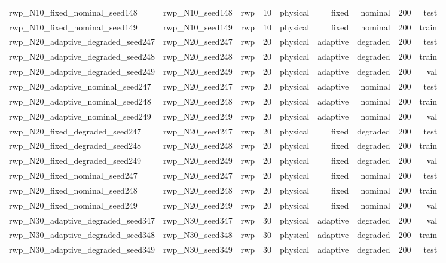 \begin{tabular}{lrrrrrrrr}
rwp\_N10\_fixed\_nominal\_seed148 & rwp\_N10\_seed148 & rwp & 10 & physical & fixed & nominal & 200 & test \\
rwp\_N10\_fixed\_nominal\_seed149 & rwp\_N10\_seed149 & rwp & 10 & physical & fixed & nominal & 200 & train \\
rwp\_N20\_adaptive\_degraded\_seed247 & rwp\_N20\_seed247 & rwp & 20 & physical & adaptive & degraded & 200 & test \\
rwp\_N20\_adaptive\_degraded\_seed248 & rwp\_N20\_seed248 & rwp & 20 & physical & adaptive & degraded & 200 & train \\
rwp\_N20\_adaptive\_degraded\_seed249 & rwp\_N20\_seed249 & rwp & 20 & physical & adaptive & degraded & 200 & val \\
rwp\_N20\_adaptive\_nominal\_seed247 & rwp\_N20\_seed247 & rwp & 20 & physical & adaptive & nominal & 200 & test \\
rwp\_N20\_adaptive\_nominal\_seed248 & rwp\_N20\_seed248 & rwp & 20 & physical & adaptive & nominal & 200 & train \\
rwp\_N20\_adaptive\_nominal\_seed249 & rwp\_N20\_seed249 & rwp & 20 & physical & adaptive & nominal & 200 & val \\
rwp\_N20\_fixed\_degraded\_seed247 & rwp\_N20\_seed247 & rwp & 20 & physical & fixed & degraded & 200 & test \\
rwp\_N20\_fixed\_degraded\_seed248 & rwp\_N20\_seed248 & rwp & 20 & physical & fixed & degraded & 200 & train \\
rwp\_N20\_fixed\_degraded\_seed249 & rwp\_N20\_seed249 & rwp & 20 & physical & fixed & degraded & 200 & val \\
rwp\_N20\_fixed\_nominal\_seed247 & rwp\_N20\_seed247 & rwp & 20 & physical & fixed & nominal & 200 & test \\
rwp\_N20\_fixed\_nominal\_seed248 & rwp\_N20\_seed248 & rwp & 20 & physical & fixed & nominal & 200 & train \\
rwp\_N20\_fixed\_nominal\_seed249 & rwp\_N20\_seed249 & rwp & 20 & physical & fixed & nominal & 200 & val \\
rwp\_N30\_adaptive\_degraded\_seed347 & rwp\_N30\_seed347 & rwp & 30 & physical & adaptive & degraded & 200 & val \\
rwp\_N30\_adaptive\_degraded\_seed348 & rwp\_N30\_seed348 & rwp & 30 & physical & adaptive & degraded & 200 & train \\
rwp\_N30\_adaptive\_degraded\_seed349 & rwp\_N30\_seed349 & rwp & 30 & physical & adaptive & degraded & 200 & test \\

\end{tabular}
